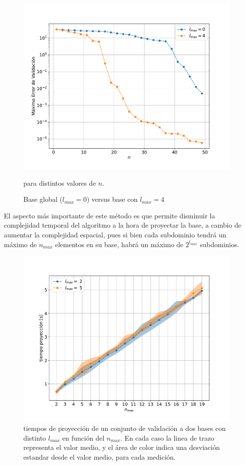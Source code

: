 \begin{figure}[h!]
\centering
\includegraphics[width=.8\columnwidth, trim={0, 1.3cm, 0, 1.4cm}]{figs/l0vsl4.pdf}
\caption{Base global ($l_{max} = 0$) versus base con $l_{max} = 4$} para distintos valores de $n$.
\label{fig:l0vl4}
\end{figure}


El aspecto más importante de este método es que permite disminuir la complejidad temporal del algoritmo a la hora de proyectar la base, a cambio de aumentar la complejidad espacial, pues si bien cada subdominio tendrá un máximo de $n_{max}$ elementos en su base, habrá un máximo de $2^{l_{max}}$ subdominios.

\begin{figure}[h!]
\centering
\includegraphics[width=.8\columnwidth ,trim={0, 1cm, 0, 1.2cm}]{figs/t_vs_nmax.pdf}
\caption{tiempos de proyección de un conjunto de validación a dos bases con distinto $l_{max}$ en función del $n_{max}$. En cada caso la linea de trazo representa el valor medio, y el área de color indica una desviación estandar desde el valor medio, para cada medición.}
\label{fig:t_vs_nmax}
\end{figure}


